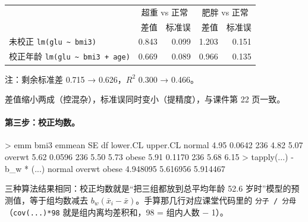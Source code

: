 \begin{tabular}{lrrrr}
\toprule
 & \multicolumn{2}{c}{超重 vs 正常} & \multicolumn{2}{c}{肥胖 vs 正常}\\

 & {差值} & {标准误} & {差值} & {标准误}\\
\midrule
未校正 \Verb|lm(glu ~ bmi3)| & 0.843 & 0.099 & 1.203 & 0.151\\
校正年龄 \Verb|lm(glu ~ bmi3 + age)| & 0.669 & 0.089 & 0.966 & 0.135\\
\bottomrule
\end{tabular}

\begin{studysource}
注：剩余标准差 0.715 → 0.626，$R^2$ 0.300 → 0.466。
\end{studysource}

差值缩小两成（控混杂），标准误同时变小（提精度），与课件第 22 页一致。

\paragraph{第三步：校正均数。}
\begin{routput}
> emm
 bmi3   emmean     SE  df lower.CL upper.CL
 normal   4.95 0.0642 236     4.82     5.07
 overwt   5.62 0.0596 236     5.50     5.73
 obese    5.91 0.1170 236     5.68     6.15
> tapply(...) - b_w * (...)
  normal   overwt    obese
4.948095 5.616956 5.914467
\end{routput}
三种算法结果相同：校正均数就是“把三组都放到总平均年龄 52.6 岁时”模型的预测值，等于组均数减去 $b_w(\bar x_i-\bar x)$。手算那几行对应课堂代码里的 \Verb|分子 / 分母|（\Verb|cov(...)*98| 就是组内离均差积和，98 = 组内人数 − 1）。

